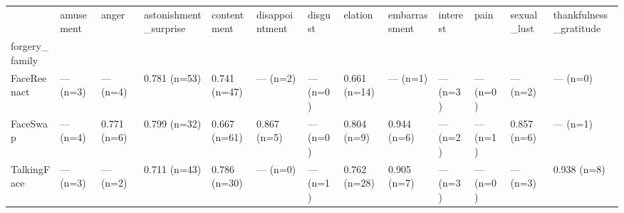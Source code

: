 \begin{tabular}{lllllllllllll}
\toprule
 & amusement & anger & astonishment\_surprise & contentment & disappointment & disgust & elation & embarrassment & interest & pain & sexual\_lust & thankfulness\_gratitude \\
forgery\_family &  &  &  &  &  &  &  &  &  &  &  &  \\
\midrule
FaceReenact & — (n=3) & — (n=4) & 0.781 (n=53) & 0.741 (n=47) & — (n=2) & — (n=0) & 0.661 (n=14) & — (n=1) & — (n=3) & — (n=0) & — (n=2) & — (n=0) \\
FaceSwap & — (n=4) & 0.771 (n=6) & 0.799 (n=32) & 0.667 (n=61) & 0.867 (n=5) & — (n=0) & 0.804 (n=9) & 0.944 (n=6) & — (n=2) & — (n=1) & 0.857 (n=6) & — (n=1) \\
TalkingFace & — (n=3) & — (n=2) & 0.711 (n=43) & 0.786 (n=30) & — (n=0) & — (n=1) & 0.762 (n=28) & 0.905 (n=7) & — (n=3) & — (n=0) & — (n=3) & 0.938 (n=8) \\
\bottomrule
\end{tabular}
